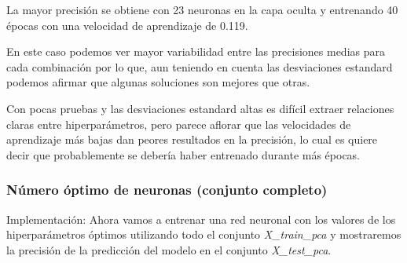 \documentclass[11pt]{article}
\begin{document}
La mayor precisión se obtiene con 23 neuronas en la capa oculta y
entrenando 40 épocas con una velocidad de aprendizaje de 0.119.

En este caso podemos ver mayor variabilidad entre las precisiones medias
para cada combinación por lo que, aun teniendo en cuenta las
desviaciones estandard podemos afirmar que algunas soluciones son
mejores que otras.

Con pocas pruebas y las desviaciones estandard altas es difícil extraer
relaciones claras entre hiperparámetros, pero parece aflorar que las
velocidades de aprendizaje más bajas dan peores resultados en la
precisión, lo cual es quiere decir que probablemente se debería haber
entrenado durante más épocas.

    \hypertarget{nuxfamero-uxf3ptimo-de-neuronas-conjunto-completo}{%
\subsubsection{Número óptimo de neuronas (conjunto
completo)}\label{nuxfamero-uxf3ptimo-de-neuronas-conjunto-completo}}

Implementación: Ahora vamos a entrenar una red neuronal con los valores
de los hiperparámetros óptimos utilizando todo el conjunto
\emph{X\_train\_pca} y mostraremos la precisión de la predicción del
modelo en el conjunto \emph{X\_test\_pca}.
\end{document}
